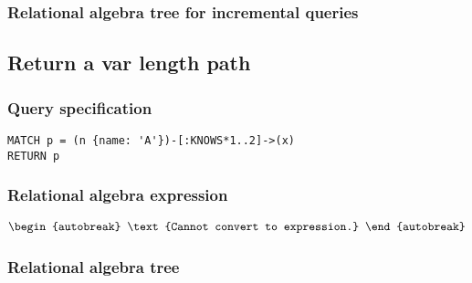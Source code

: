 \subsubsection*{Relational algebra tree for incremental queries}


\subsection{Return a var length path}

\subsubsection*{Query specification}

\begin{lstlisting}
MATCH p = (n {name: 'A'})-[:KNOWS*1..2]->(x)
RETURN p
\end{lstlisting}

\subsubsection*{Relational algebra expression}

\begin{align*}
\begin{autobreak}
\text{Cannot convert to expression.}
\end{autobreak}
\end{align*}

\subsubsection*{Relational algebra tree}


